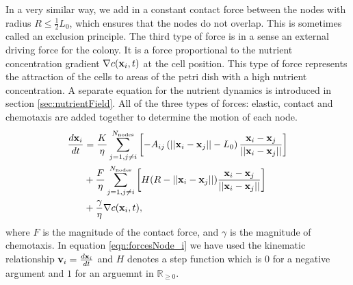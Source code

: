 In a very similar way, we add in a constant contact force between the nodes with radius $R \leq \frac{1}{2}L_0$,
which ensures that the nodes do not overlap. This is sometimes called an exclusion principle. The third 
type of force is in a sense an external driving force for the colony. It is a force 
proportional to the nutrient concentration gradient $\nabla c(\vb{x}_i, t)$ at the cell position. This type of 
force represents the attraction of the cells to areas of the petri dish with a high nutrient concentration.
A separate equation for the nutrient dynamics is introduced in section \ref{sec:nutrientField}. 
All of the three types of forces: elastic, contact and chemotaxis are added together to 
determine the motion of each node.
\begin{equation} \label{eqn:forcesNode_i}
    \begin{split}
        \frac{d \vb{x}_i}{dt} &= 
        \frac{K}{ \eta}\sum_{j = 1, j \neq i}^{N_{\textrm{nodes}}}   \left[ - A_{ij} \left( ||\vb{x}_i - \vb{x}_j|| - L_0\right) \frac{\vb{x}_i - \vb{x}_j}{||\vb{x}_i - \vb{x}_j||} \right]\\
         &+ \frac{F}{ \eta}\sum_{j = 1, j \neq i}^{N_{\textrm{nodes}}} \left[ H(R - ||\vb{x}_i - \vb{x}_j||) \frac{\vb{x}_i - \vb{x}_j}{||\vb{x}_i - \vb{x}_j||}     \right]\\ 
         &+ \frac{\gamma}{\eta} \nabla c (\vb{x}_i, t),
    \end{split}
\end{equation}
where $F$ is the magnitude of the contact force, and $\gamma$ is the magnitude of chemotaxis. In equation 
\ref{eqn:forcesNode_i} we have used the kinematic relationship $\vb{v}_i = \frac{d \vb{x}_i}{dt}$ and 
$H$ denotes a step function which is $0$ for a negative argument and $1$ for an arguemnt in 
$\mathbb{R}_{\geq 0}$.



